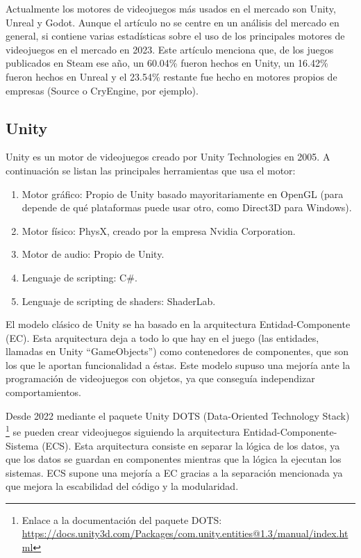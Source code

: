 Actualmente los motores de videojuegos más usados en el mercado son Unity, Unreal y Godot.
Aunque el artículo \cite{SGE} no se centre en un análisis del mercado en general, si contiene varias estadísticas sobre el uso de los principales motores de videojuegos en el mercado en 2023.
Este artículo menciona que, de los juegos publicados en Steam ese año, un 60.04\% fueron hechos en Unity, un 16.42\% fueron hechos en Unreal y el 23.54\% restante fue hecho en motores propios de empresas (Source o CryEngine, por ejemplo).

\subsection{Unity}
Unity es un motor de videojuegos creado por Unity Technologies en 2005. A continuación se listan las principales herramientas que usa el motor:

\begin{enumerate}
    \item Motor gráfico: Propio de Unity basado mayoritariamente en OpenGL (para depende de qué plataformas puede usar otro, como Direct3D para Windows).
    \item Motor físico: PhysX, creado por la empresa Nvidia Corporation.
    \item Motor de audio: Propio de Unity.
    \item Lenguaje de scripting: C\#.
    \item Lenguaje de scripting de shaders: ShaderLab.
\end{enumerate}

El modelo clásico de Unity se ha basado en la arquitectura Entidad-Componente (EC).
Esta arquitectura deja a todo lo que hay en el juego (las entidades, llamadas en Unity ``GameObjects'') como contenedores de componentes, que son los que le aportan funcionalidad a éstas.
Este modelo supuso una mejoría ante la programación de videojuegos con objetos, ya que conseguía independizar comportamientos.

Desde 2022 mediante el paquete Unity DOTS (Data-Oriented Technology Stack) \footnote{Enlace a la documentación del paquete DOTS: \url{https://docs.unity3d.com/Packages/com.unity.entities@1.3/manual/index.html}} se pueden crear videojuegos siguiendo la arquitectura Entidad-Componente-Sistema (ECS).
Esta arquitectura consiste en separar la lógica de los datos, ya que los datos se guardan en componentes mientras que la lógica la ejecutan los sistemas.
ECS supone una mejoría a EC gracias a la separación mencionada ya que mejora la escabilidad del código y la modularidad.

